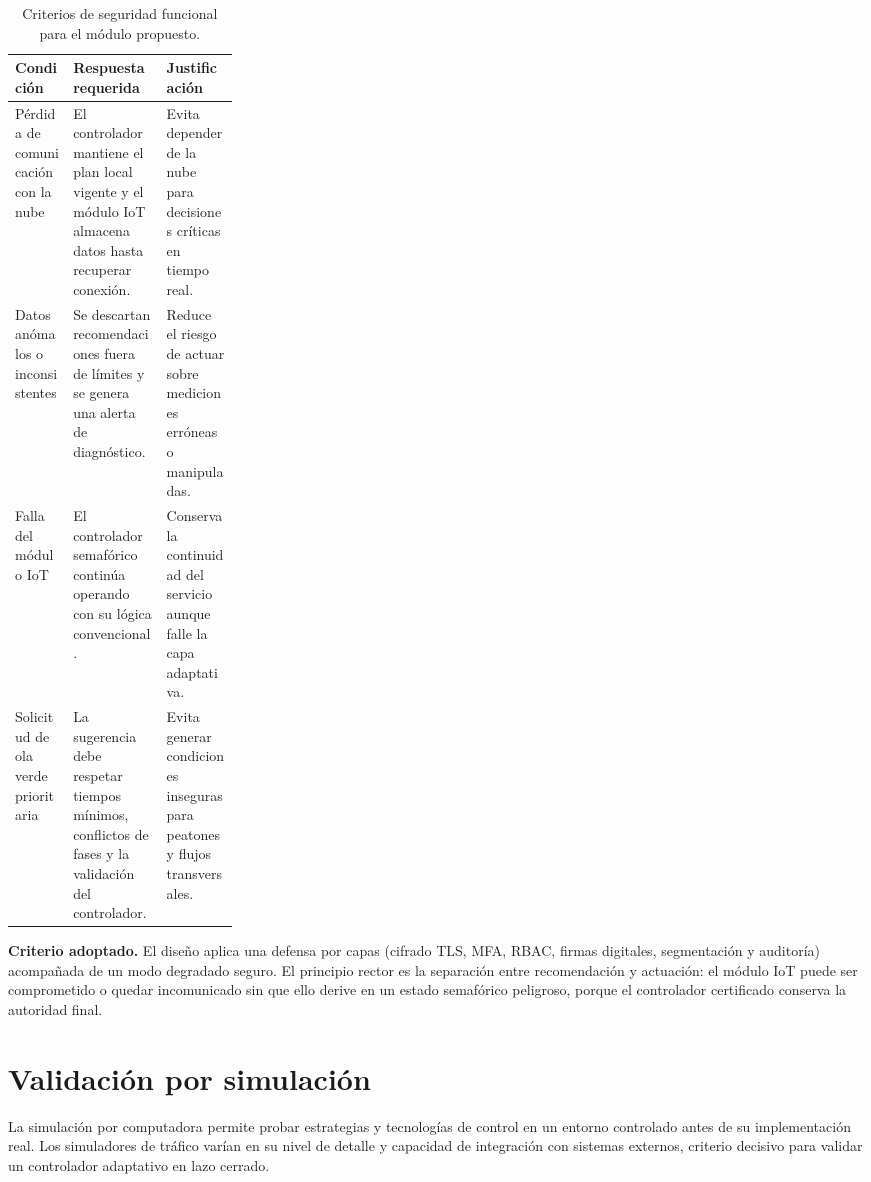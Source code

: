 \begin{table}[H]
  \centering
  \caption{Criterios de seguridad funcional para el módulo propuesto.}
  \label{tab:seg-funcional}
  \begin{tabularx}{\linewidth}{@{}>{\raggedright\arraybackslash}p{0.26\linewidth}XX@{}}
    \toprule
    \textbf{Condición} & \textbf{Respuesta requerida} & \textbf{Justificación} \\
    \midrule
    Pérdida de comunicación con la nube & El controlador mantiene el plan local vigente y el módulo IoT almacena datos hasta recuperar conexión. & Evita depender de la nube para decisiones críticas en tiempo real. \\
    Datos anómalos o inconsistentes & Se descartan recomendaciones fuera de límites y se genera una alerta de diagnóstico. & Reduce el riesgo de actuar sobre mediciones erróneas o manipuladas. \\
    Falla del módulo IoT & El controlador semafórico continúa operando con su lógica convencional. & Conserva la continuidad del servicio aunque falle la capa adaptativa. \\
    Solicitud de ola verde prioritaria & La sugerencia debe respetar tiempos mínimos, conflictos de fases y la validación del controlador. & Evita generar condiciones inseguras para peatones y flujos transversales. \\
    \bottomrule
  \end{tabularx}
\end{table}

\textbf{Criterio adoptado.} El diseño aplica una defensa por capas (cifrado TLS, MFA, RBAC, firmas digitales,
segmentación y auditoría) acompañada de un modo degradado seguro. El principio rector es la separación entre
recomendación y actuación: el módulo IoT puede ser comprometido o quedar incomunicado sin que ello derive en
un estado semafórico peligroso, porque el controlador certificado conserva la autoridad final.

\section{Validación por simulación}\label{sec:validacion}

La simulación por computadora permite probar estrategias y tecnologías de control en un entorno controlado
antes de su implementación real. Los simuladores de tráfico varían en su nivel de detalle y capacidad de
integración con sistemas externos, criterio decisivo para validar un controlador adaptativo en lazo cerrado.

